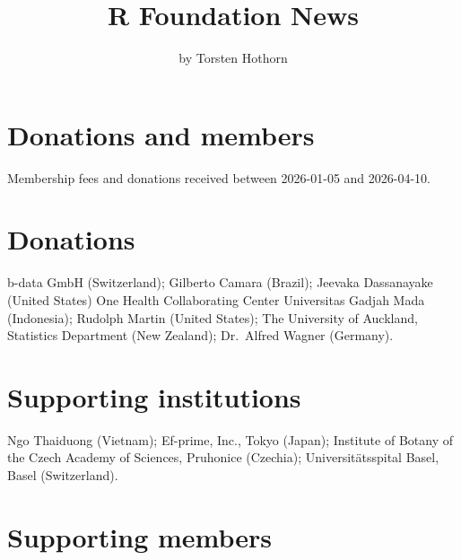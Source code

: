 \title{R Foundation News}


\author{by Torsten Hothorn}

\maketitle


\section{Donations and members}\label{donations-and-members}

Membership fees and donations received between
2026-01-05 and 2026-04-10.

\section{Donations}\label{donations}

b-data GmbH (Switzerland);
Gilberto Camara (Brazil);
Jeevaka Dassanayake (United States)
One Health Collaborating Center Universitas Gadjah Mada (Indonesia);
Rudolph Martin (United States);
The University of Auckland, Statistics Department (New Zealand);
Dr.~Alfred Wagner (Germany).

\section{Supporting institutions}\label{supporting-institutions}

Ngo Thaiduong (Vietnam);
Ef-prime, Inc., Tokyo (Japan);
Institute of Botany of the Czech Academy of Sciences, Pruhonice (Czechia);
Universitätsspital Basel, Basel (Switzerland).

\section{Supporting members}\label{supporting-members}

